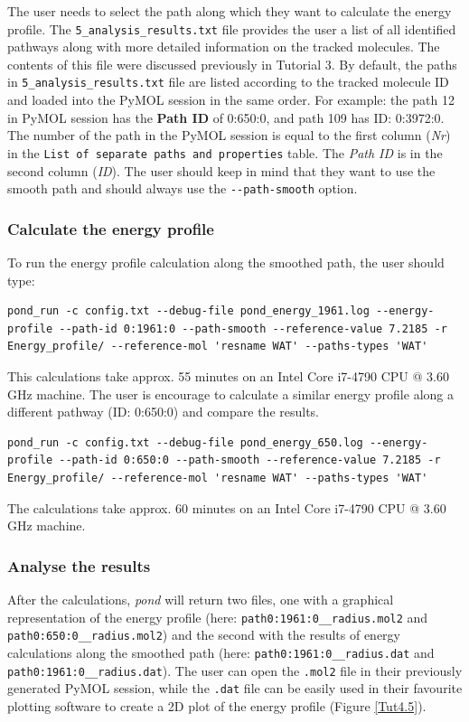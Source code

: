 \documentclass[9pt,tutorial, pubversion]{livecoms}
\begin{document}
The user needs to select the path along which they want to calculate the energy profile. The \texttt{5\_analysis\_results.txt} file provides the user a list of all identified pathways along with more detailed information on the tracked molecules. The contents of this file were discussed previously in Tutorial 3. By default, the paths in \texttt{5\_analysis\_results.txt} file are listed according to the tracked molecule ID and loaded into the PyMOL session in the same order. For example: the path 12 in PyMOL session has the \textbf{Path ID} of 0:650:0, and path 109 has ID: 0:3972:0. The number of the path in the PyMOL session is equal to the first column (\emph{Nr}) in the \texttt{List of separate paths and properties} table. The \textit{Path ID} is in the second column (\emph{ID}). The user should keep in mind that they want to use the smooth path and should always use the \texttt{-{}-path-smooth} option.

\subsubsection{Calculate the energy profile}
To run the energy profile calculation along the smoothed path, the user should type:
\begin{lstlisting}
pond_run -c config.txt --debug-file pond_energy_1961.log --energy-profile --path-id 0:1961:0 --path-smooth --reference-value 7.2185 -r Energy_profile/ --reference-mol 'resname WAT' --paths-types 'WAT'
\end{lstlisting}
This calculations take approx. 55 minutes on an Intel Core i7-4790 CPU @ 3.60 GHz machine.
The user is encourage to calculate a similar energy profile along a different pathway (ID: 0:650:0) and compare the results.
\begin{lstlisting}
pond_run -c config.txt --debug-file pond_energy_650.log --energy-profile --path-id 0:650:0 --path-smooth --reference-value 7.2185 -r Energy_profile/ --reference-mol 'resname WAT' --paths-types 'WAT'
\end{lstlisting}
The calculations take approx. 60 minutes on an Intel Core i7-4790 CPU @ 3.60 GHz machine.

\subsubsection{Analyse the results}
After the calculations, \emph{pond} will return two files, one with a graphical representation of the energy profile (here: \texttt{path0:1961:0\_\_radius.mol2} and \texttt{path0:650:0\_\_radius.mol2}) and the second with the results of energy calculations along the smoothed path (here: \texttt{path0:1961:0\_\_radius.dat} and \texttt{path0:1961:0\_\_radius.dat}). The user can open the \texttt{.mol2} file in their previously generated PyMOL session, while the \texttt{.dat} file can be easily used in their favourite plotting software to create a 2D plot of the energy profile (Figure \ref{Tut4.5}).
\end{document}
